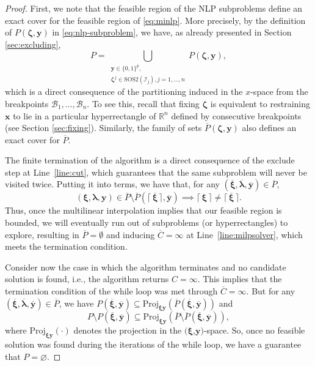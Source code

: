 \documentclass[pdflatex,sn-mathphys-num]{sn-jnl}%
\newcommand{\new}[1]{#1}
\newcommand{\R}{\mathbb{R}}
\begin{document}
\begin{proof}
\new{%
First, we note that the feasible region of the NLP subproblems define an exact cover for the feasible region of \ref{eq:minlp}.
More precisely, by the definition of $P(\bm{\zeta},\bm{y})$ in \eqref{eq:nlp-subproblem}, we have, as already presented in Section \ref{sec:excluding},
\begin{equation}
P = \bigcup_{\substack{\bm{y}\in\{0,1\}^p,\\ \bm{\zeta}^j\in \text{SOS2}(\mathcal{I}_j), j=1,\ldots,n}} P(\bm{\zeta},\bm{y})
,\end{equation}
which is a direct consequence of the partitioning induced in the $x$-space from the breakpoints $\mathcal{B}_1,\ldots,\mathcal{B}_n$.
To see this, recall that fixing $\bm{\zeta}$ is equivalent to restraining $\bm{x}$ to lie in a particular hyperrectangle of $\R^n$ defined by consecutive breakpoints (see Section \ref{sec:fixing}).
Similarly, the family of sets $\overline{P}(\bm{\zeta},\bm{y})$ also defines an exact cover for $\overline{P}$.
}

\new{%
The finite termination of the algorithm is a direct consequence of the exclude step at Line~\ref{line:cut}, which guarantees that the same subproblem will never be visited twice.
Putting it into terms, we have that, for any $(\overline{\bm{\xi}},\overline{\bm{\lambda}},\overline{\bm{y}})\in\overline{P}$,
\begin{equation}
(\bm{\xi},\bm{\lambda},\bm{y}) \in \overline{P} \setminus \overline{P}(\lceil\,\overline{\bm{\xi}}\,\rceil,\overline{\bm{y}}) \implies \lceil\,\bm{\xi}\,\rceil \neq \lceil\,\overline{\bm{\xi}}\,\rceil
.\end{equation}
Thus, once the multilinear interpolation implies that our feasible region is bounded, we will eventually run out of subproblems (or hyperrectangles) to explore, resulting in $\overline{P}=\emptyset$ and inducing $\overline{C}=\infty$ at Line~\ref{line:milpsolver}, which meets the termination condition.
}

\new{%
Consider now the case in which the algorithm terminates and no candidate solution is found, i.e., the algorithm returns $C = \infty$.
This implies that the termination condition of the while loop was met through $\overline{C}=\infty$.
But for any $(\overline{\bm{\xi}},\overline{\bm{\lambda}},\overline{\bm{y}})\in\overline{P}$, we have $P(\overline{\bm{\xi}},\overline{\bm{y}}) \subseteq \text{Proj}_{\bm{\xi}\bm{y}}(\overline{P}(\overline{\bm{\xi}},\overline{\bm{y}}))$ and
\begin{equation}
P \setminus P(\overline{\bm{\xi}},\overline{\bm{y}}) \subseteq \text{Proj}_{\bm{\xi}\bm{y}} (\overline{P}\setminus\overline{P}(\overline{\bm{\xi}},\overline{\bm{y}}))
,\end{equation}
where $\text{Proj}_{\bm{\xi}\bm{y}}(\cdot)$ denotes the projection in the $(\bm{\xi}$,$\bm{y})$-space.
So, once no feasible solution was found during the iterations of the while loop, we have a guarantee that $P=\varnothing$.
}


\end{proof}
\end{document}
